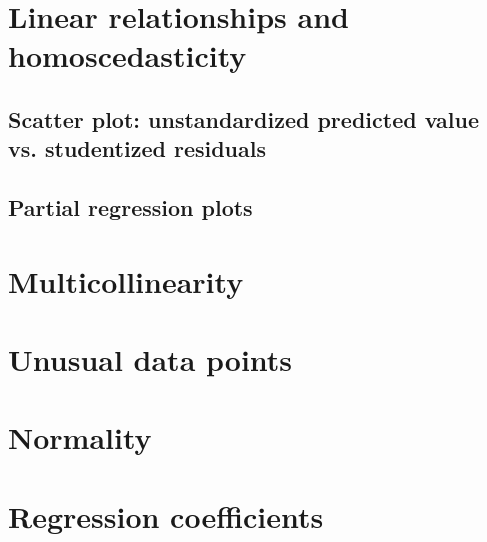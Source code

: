 \documentclass{sigchi}
\begin{document}




\clearpage
\onecolumn

\appendix
\section{Linear relationships and homoscedasticity}
\label{app:linear_relationships}

\subsection{Scatter plot: unstandardized predicted value vs. studentized residuals}
\hfill \break

\clearpage

\subsection{Partial regression plots}
\hfill \break


\clearpage

\section{Multicollinearity} %
\label{app:multicollinearity}
\hfill \break

\clearpage

\section{Unusual data points} %
\label{sec:unusual_data_points}
\hfill \break

\clearpage

\section{Normality} %
\label{app:normality}
\hfill \break

\clearpage

\section{Regression coefficients} %
\label{sec:regression_coefficients}
\hfill \break

\end{document}
